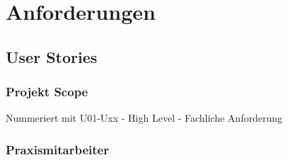 \section{Anforderungen}\label{sec:anforderungen}

\subsection{User Stories}\label{subsec:user-stories}

\subsubsection*{Projekt Scope}


Nummeriert mit U01-Uxx - High Level - Fachliche Anforderung

\subsubsection*{Praxismitarbeiter}

